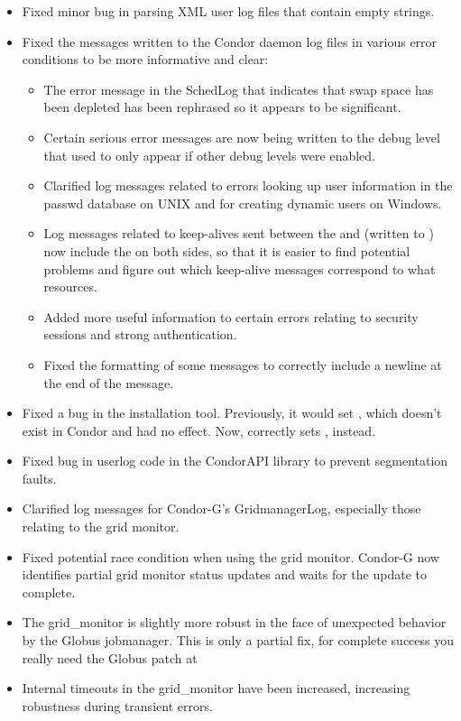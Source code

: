 \begin{itemize}
\item Fixed minor bug in parsing XML user log files that contain empty
  strings. 

\item Fixed the messages written to the Condor daemon log files in
  various error conditions to be more informative and clear:
  \begin{itemize}
  \item The error message in the SchedLog that indicates that swap
    space has been depleted has been rephrased so it appears to be
    significant.
  \item Certain serious error messages are now being written to the 
     debug level that used to only appear if other debug
    levels were enabled.
  \item Clarified log messages related to errors looking up user
    information in the passwd database on UNIX and for creating
    dynamic users on Windows.
  \item Log messages related to keep-alives sent between the
     and  (written to )
    now include the  on both sides, so that it is easier
    to find potential problems and figure out which keep-alive
    messages correspond to what resources.
  \item Added more useful information to certain errors relating to 
    security sessions and strong authentication.
  \item Fixed the formatting of some messages to correctly include a
    newline at the end of the message.
  \end{itemize}

\item Fixed a bug in the  installation tool.
  Previously, it would set , which doesn't exist
  in Condor and had no effect.
  Now,  correctly sets , instead.

\item Fixed bug in userlog code in the CondorAPI library to prevent
  segmentation faults.

\item Clarified log messages for Condor-G's GridmanagerLog,
  especially those relating to the grid monitor.

\item Fixed potential race condition when using the grid monitor.  
  Condor-G now identifies partial grid monitor status updates and 
  waits for the update to complete.


\item The grid\_monitor is slightly more robust in the face of
  unexpected behavior by the Globus jobmanager.  This is only a
  partial fix, for complete success you really need the Globus
  patch at

\item Internal timeouts in the grid\_monitor have been increased,
  increasing robustness during transient errors.

\end{itemize}

